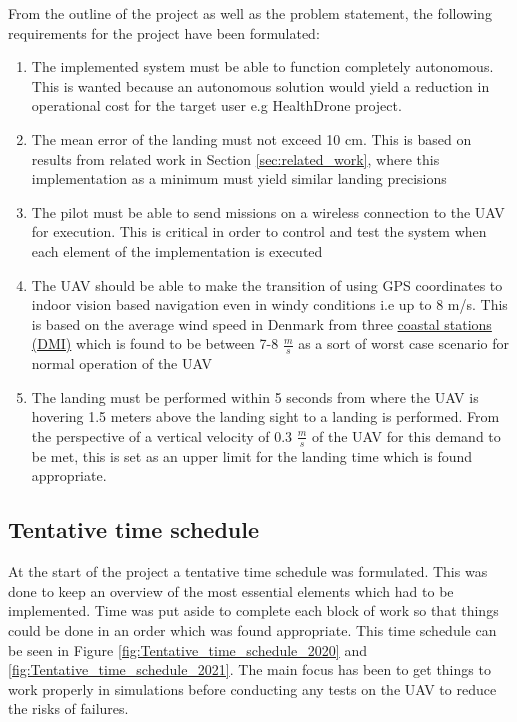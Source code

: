 \documentclass[../Head/report.tex]{subfiles}
\begin{document}
From the outline of the project as well as the problem statement, the following requirements for the project have been formulated:

\begin{enumerate}[label=\textbf{R.\arabic*}]
	\item \label{sor:one} The implemented system must be able to function completely autonomous. This is wanted because an autonomous solution would yield a reduction in operational cost for the target user e.g HealthDrone project.   
    \item \label{sor:two} The mean error of the landing must not exceed 10 cm. This is based on results from related work in Section \ref{sec:related_work}, where this implementation as a minimum must yield similar landing precisions
    \item \label{sor:three} The pilot must be able to send missions on a wireless connection to the UAV for execution. This is critical in order to control and test the system when each element of the implementation is executed 
    \item \label{sor:four} The UAV should be able to make the transition of using GPS coordinates to indoor vision based navigation even in windy conditions i.e up to 8 m/s. This is based on the average wind speed in Denmark from three \href{https://www.dmi.dk/klima/temaforside-klimaet-frem-til-i-dag/vind-i-danmark/}{coastal stations (DMI)} which is found to be between 7-8 $\frac{m}{s}$ as a sort of worst case scenario for normal operation of the UAV
    \item \label{sor:five} The landing must be performed within 5 seconds from where the UAV is hovering 1.5 meters above the landing sight to a landing is performed. From the perspective of a vertical velocity of 0.3 $\frac{m}{s}$ of the UAV for this demand to be met, this is set as an upper limit for the landing time which is found appropriate.   

\end{enumerate}


\newpage
\subsection{Tentative time schedule}
\label{sec:tentative_time_schedule}

At the start of the project a tentative time schedule was formulated. This was done to keep an overview of the most essential elements which had to be implemented. Time was put aside to complete each block of work so that things could be done in an order which was found appropriate.  This time schedule can be seen in Figure \ref{fig:Tentative_time_schedule_2020} and \ref{fig:Tentative_time_schedule_2021}. The main focus has been to get things to work properly in simulations before conducting any tests on the UAV to reduce the risks of failures.  
\end{document}
